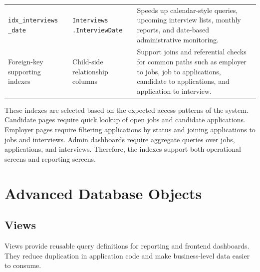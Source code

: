 \documentclass[12pt,a4paper]{report}
\makeatletter
\newcommand{\codebreak}[1]{\begin{tabular}[t]{@{}l@{}}#1\end{tabular}}
\makeatother
\begin{document}
\begin{longtable}{L{0.25\textwidth}L{0.26\textwidth}L{0.39\textwidth}}
\codebreak{\texttt{idx\_interviews}\\\texttt{\_date}} & \codebreak{\texttt{Interviews}\\\texttt{.InterviewDate}} & Speeds up calendar-style queries, upcoming interview lists, monthly reports, and date-based administrative monitoring. \\
Foreign-key supporting indexes & Child-side relationship columns & Support joins and referential checks for common paths such as employer to jobs, job to applications, candidate to applications, and application to interview. \\
\bottomrule
\end{longtable}

These indexes are selected based on the expected access patterns of the system. Candidate pages require quick lookup of open jobs and candidate applications. Employer pages require filtering applications by status and joining applications to jobs and interviews. Admin dashboards require aggregate queries over jobs, applications, and interviews. Therefore, the indexes support both operational screens and reporting screens.

\chapter{Advanced Database Objects}

\section{Views}

Views provide reusable query definitions for reporting and frontend dashboards. They reduce duplication in application code and make business-level data easier to consume.
\end{document}
